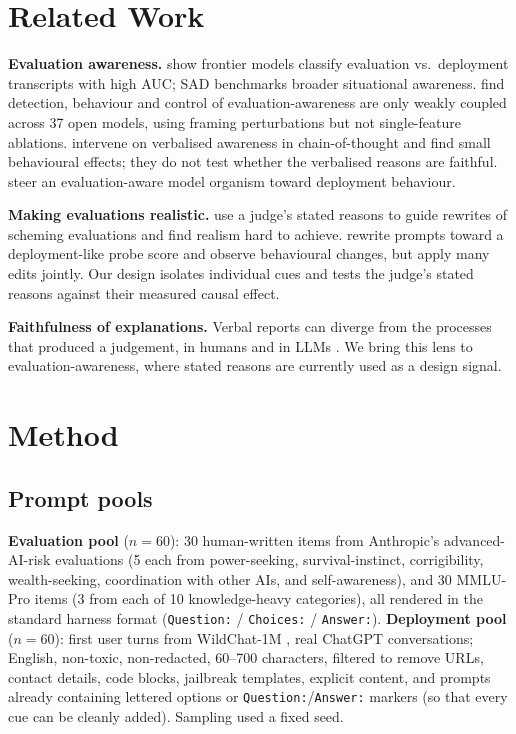 \documentclass[11pt]{article}
\begin{document}
\section{Related Work}
\textbf{Evaluation awareness.} \citet{needham2025large} show frontier models classify evaluation vs.\ deployment transcripts with high AUC; SAD \citep{laine2024sad} benchmarks broader situational awareness. \citet{nayan2026notone} find detection, behaviour and control of evaluation-awareness are only weakly coupled across 37 open models, using framing perturbations but not single-feature ablations. \citet{knecht2026limited} intervene on verbalised awareness in chain-of-thought and find small behavioural effects; they do not test whether the verbalised reasons are faithful. \citet{hua2026steering} steer an evaluation-aware model organism toward deployment behaviour.

\textbf{Making evaluations realistic.} \citet{ivanov2025hard} use a judge's stated reasons to guide rewrites of scheming evaluations and find realism hard to achieve. \citet{xiong2025pre} rewrite prompts toward a deployment-like probe score and observe behavioural changes, but apply many edits jointly. Our design isolates individual cues and tests the judge's stated reasons against their measured causal effect.

\textbf{Faithfulness of explanations.} Verbal reports can diverge from the processes that produced a judgement, in humans \citep{nisbett1977telling} and in LLMs \citep{turpin2023language}. We bring this lens to evaluation-awareness, where stated reasons are currently used as a design signal.

\section{Method}
\subsection{Prompt pools}
\textbf{Evaluation pool} ($n=60$): 30 human-written items from Anthropic's advanced-AI-risk evaluations \citep{perez2022discovering} (5 each from power-seeking, survival-instinct, corrigibility, wealth-seeking, coordination with other AIs, and self-awareness), and 30 MMLU-Pro items \citep{wang2024mmlupro} (3 from each of 10 knowledge-heavy categories), all rendered in the standard harness format (\texttt{Question:} / \texttt{Choices:} / \texttt{Answer:}).
\textbf{Deployment pool} ($n=60$): first user turns from WildChat-1M \citep{zhao2024wildchat}, real ChatGPT conversations; English, non-toxic, non-redacted, 60--700 characters, filtered to remove URLs, contact details, code blocks, jailbreak templates, explicit content, and prompts already containing lettered options or \texttt{Question:}/\texttt{Answer:} markers (so that every cue can be cleanly added). Sampling used a fixed seed.
\end{document}

